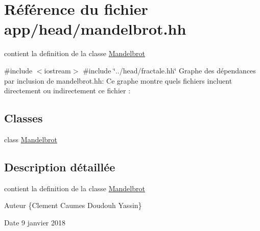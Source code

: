 \hypertarget{mandelbrot_8hh}{}\section{Référence du fichier app/head/mandelbrot.hh}
\label{mandelbrot_8hh}


contient la definition de la classe \hyperlink{classMandelbrot}{Mandelbrot}  


{\ttfamily \#include $<$iostream$>$}\newline
{\ttfamily \#include \char`\"{}../head/fractale.\+hh\char`\"{}}\newline
Graphe des dépendances par inclusion de mandelbrot.\+hh\+:
Ce graphe montre quels fichiers incluent directement ou indirectement ce fichier \+:
\subsection*{Classes}
\begin{DoxyCompactItemize}
\item 
class \hyperlink{classMandelbrot}{Mandelbrot}
\end{DoxyCompactItemize}


\subsection{Description détaillée}
contient la definition de la classe \hyperlink{classMandelbrot}{Mandelbrot} 

\begin{DoxyAuthor}{Auteur}
\{Clement Caumes Doudouh Yassin\} 
\end{DoxyAuthor}
\begin{DoxyDate}{Date}
9 janvier 2018 
\end{DoxyDate}
